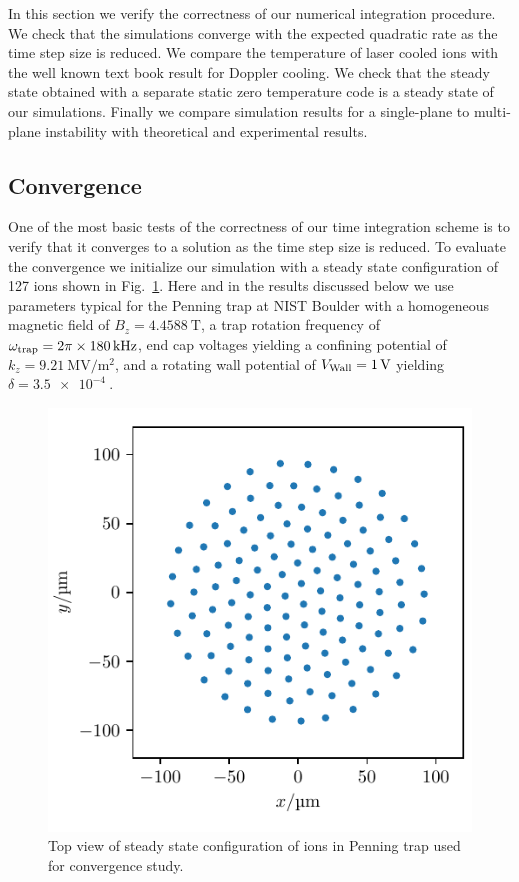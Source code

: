 \documentclass[aps, pra, preprint]{revtex4-1}
\begin{document}
In this section we verify the correctness of our numerical
integration procedure. We check that the simulations converge
with the expected quadratic rate as the time step size is
reduced. We compare the temperature of laser cooled ions with the
well known text book result for Doppler cooling. We check that
the steady state obtained with a separate static zero temperature
code is a steady state of our simulations. Finally we compare
simulation results for a single-plane to multi-plane instability
with theoretical and experimental results.


\subsection{Convergence}

One of the most basic tests of the correctness of our time
integration scheme is to verify that it converges to a solution
as the time step size is reduced. To evaluate the convergence we
initialize our simulation with a steady state configuration of
127 ions shown in Fig.~\ref{fig:initial_state_top_view}. Here and
in the results discussed below we use parameters typical for the
Penning trap at NIST Boulder with a homogeneous magnetic field of
$B_z=\SI{4.4588}{\tesla}$, a trap rotation frequency of
$\omega_{\rm trap}=2\pi\times \SI{180}{\kilo \hertz}$, end cap
voltages yielding a confining potential of
$k_z=\SI{9.21}{\mega\volt/\meter^2}$, and a rotating wall
potential of $V_{\rm Wall} = \SI{1}{\volt}$ yielding
$\delta=\SI{3.5e-4}{}$.
\begin{figure}
  \includegraphics{./figures/fig_initial_state_top_view.pdf}
  \caption{Top view of steady state configuration of ions in
    Penning trap used for convergence study.}
  \label{fig:initial_state_top_view}
\end{figure}
\end{document}
